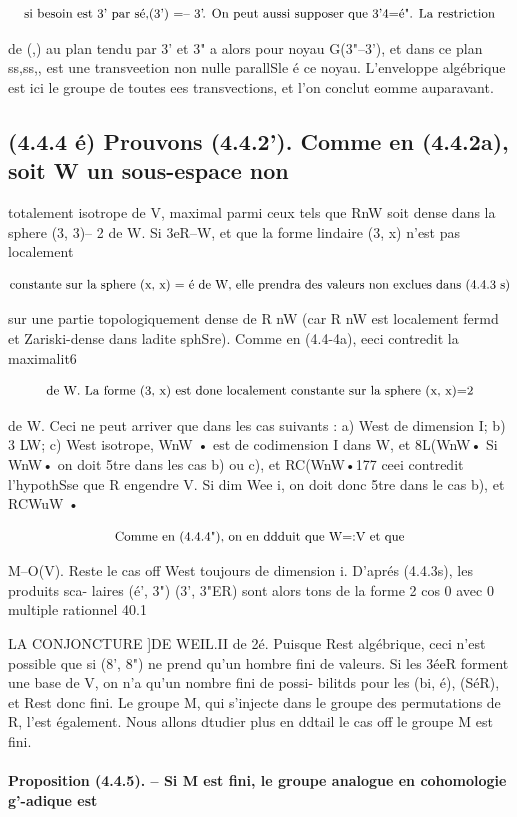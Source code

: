 \documentclass[11pt]{article}
\theoremstyle{remark}
\begin{document}
\[\text{\small si besoin est 3' par sé,(3') =-- 3'. On peut aussi supposer que 3'4=é". La restriction}\]

de (,) au plan tendu par 3' et 3" a alors pour noyau G(3"--3'), et dans ce plan ss,ss,, est une transveetion non nulle parallSle é ce noyau. L'enveloppe algébrique est ici le groupe de toutes ees transvections, et l'on conclut eomme auparavant.

\subsection*{(4.4.4 é) Prouvons (4.4.2'). Comme en (4.4.2a), soit W un sous-espace non}

totalement isotrope de V, maximal parmi ceux tels que RnW soit dense dans la sphere (3, 3)-- 2 de W. Si 3eR--W, et que la forme lindaire (3, x) n'est pas localement

\[\text{\small constante sur la sphere (x, x) = é de W, elle prendra des valeurs non exclues dans (4.4.3 s)}\]

sur une partie topologiquement dense de R nW (car R nW est localement fermd et Zariski-dense dans ladite sphSre). Comme en (4.4-4a), eeci contredit la maximalit6

\[\text{\small de W. La forme (3, x) est done localement constante sur la sphere (x, x)=2}\]

de W. Ceci ne peut arriver que dans les cas suivants : a) West de dimension I; b) 3 LW; c) West isotrope, WnW • est de codimension I dans W, et 8L(WnW• Si WnW• on doit 5tre dans les cas b) ou c), et RC(WnW•177 ceei contredit l'hypothSse que R engendre V. Si dim Wee i, on doit donc 5tre dans le cas b), et RCWuW •

\[\text{\small Comme en (4.4.4"), on en ddduit que W=:V et que}\]

M--O(V). Reste le cas off West toujours de dimension i. D'aprés (4.4.3s), les produits sca- laires (é', 3") (3', 3"ER) sont alors tons de la forme 2 cos 0 avec 0 multiple rationnel 40.1

LA CONJONCTURE ]DE WEIL.II de 2é. Puisque Rest algébrique, ceci n'est possible que si (8', 8") ne prend qu'un hombre fini de valeurs. Si les 3éeR forment une base de V, on n'a qu'un nombre fini de possi- bilitds pour les (bi, é), (SéR), et Rest donc fini. Le groupe M, qui s'injecte dans le groupe des permutations de R, l'est également. Nous allons dtudier plus en ddtail le cas off le groupe M est fini.

\paragraph{Proposition (4.4.5). -- Si M est fini, le groupe analogue en cohomologie g'-adique est}
\end{document}
